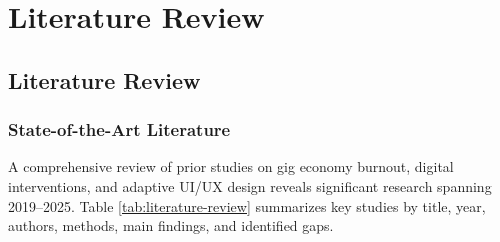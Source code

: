 \chapter{Literature Review}

\section{Literature Review}

\subsection{State-of-the-Art Literature}

A comprehensive review of prior studies on gig economy burnout, digital interventions, and adaptive UI/UX design reveals significant research spanning 2019--2025. Table \ref{tab:literature-review} summarizes key studies by title, year, authors, methods, main findings, and identified gaps.


